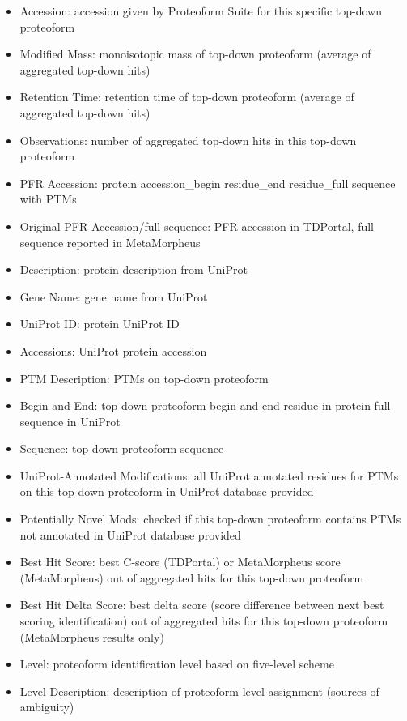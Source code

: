 \begin{itemize}
\begin{figure}[h]
\end{figure}
	\begin{itemize}
		\item Accession: accession given by Proteoform Suite for this specific top-down proteoform
		\item Modified Mass: monoisotopic mass of top-down proteoform (average of aggregated top-down hits)
		\item Retention Time: retention time of top-down proteoform (average of aggregated top-down hits)
		\item Observations: number of aggregated top-down hits in this top-down proteoform
		\item PFR Accession: protein accession\_begin residue\_end residue\_full sequence with PTMs
		\item Original PFR Accession/full-sequence: PFR accession in TDPortal, full sequence reported in MetaMorpheus
		\item Description: protein description from UniProt
		\item Gene Name: gene name from UniProt
		\item UniProt ID: protein UniProt ID
		\item Accessions: UniProt protein accession
		\item PTM Description: PTMs on top-down proteoform
		\item Begin and End: top-down proteoform begin and end residue in protein full sequence in UniProt
		\item Sequence: top-down proteoform sequence
		\item UniProt-Annotated Modifications: all UniProt annotated residues for PTMs on this top-down proteoform in UniProt database provided
		\item Potentially Novel Mods: checked if this top-down proteoform contains PTMs not annotated in UniProt database provided
		\item Best Hit Score: best C-score (TDPortal) or MetaMorpheus score (MetaMorpheus) out of aggregated hits for this top-down proteoform
		\item Best Hit Delta Score: best delta score (score difference between next best scoring identification) out of aggregated hits for this top-down proteoform (MetaMorpheus results only)
		\item Level: proteoform identification level based on five-level scheme\supercite{Smith2019b}
		\item Level Description: description of proteoform level assignment (sources of ambiguity)

\end{itemize}
\end{itemize}
